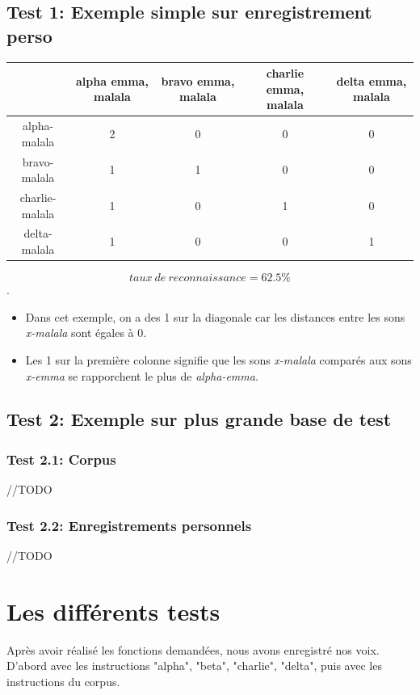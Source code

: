 \documentclass[a4paper,12pt]{article}
\begin{document}
	\subsection{Test 1: Exemple simple sur enregistrement perso}
	\begin{table}[h]
		\begin{tabular}{|c|c|c|c|c|}
			\hline
			& alpha emma, malala & bravo emma, malala & charlie emma, malala & delta emma, malala\\
			\hline
			alpha-malala & 2 & 0 & 0 & 0 \\
			\hline
			bravo-malala & 1 & 1 & 0 & 0 \\
			\hline
			charlie-malala & 1 & 0 & 1 & 0 \\
			\hline
			delta-malala & 1 & 0 & 0 & 1 \\
			\hline
		\end{tabular}
	\end{table}
	\[
   	taux\ de\ reconnaissance = 62.5 \%
	\].
	\begin{itemize}
		\item Dans cet exemple, on a des 1 sur la diagonale car les distances entre les sons \textit{x-malala} sont égales à 0.\\
		\item Les 1 sur la première colonne signifie que les sons \textit{x-malala} comparés aux sons \textit{x-emma} se rapporchent le plus de \textit{alpha-emma}.
	\end{itemize}

	\subsection{Test 2: Exemple sur plus grande base de test}
		\subsubsection{Test 2.1: Corpus}
			//TODO
		\subsubsection{Test 2.2: Enregistrements personnels}
			//TODO
			
\section{Les différents tests}

Après avoir réalisé les fonctions demandées, nous avons enregistré nos voix. D'abord avec les instructions "alpha", "beta", "charlie", "delta", puis avec les instructions du corpus.
\end{document}
